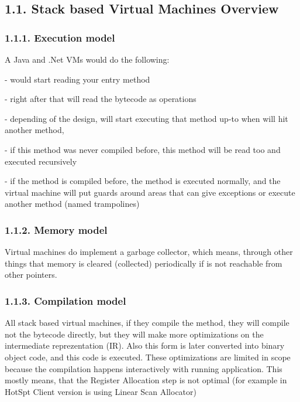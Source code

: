 \documentclass[letterpaper]{article}
\begin{document}
\bigskip

\subsection[1.1. Stack based Virtual Machines Overview]{1.1. Stack based Virtual Machines Overview}
\subsubsection[1.1.1. Execution model]{1.1.1. Execution model}
A Java and .Net VMs would do the following:

{}- would start reading your entry method

{}- right after that will read the bytecode as operations

{}- depending of the design, will start executing that method up-to when will hit another method,

{}- if this method was never compiled before, this method will be read too and executed recursively

{}- if the method is compiled before, the method is executed normally, and the virtual machine will put guards around
areas that can give exceptions or execute another method (named trampolines)


\bigskip

\subsubsection{1.1.2. Memory model}
Virtual machines do implement a garbage collector, which means, through other things that memory is cleared (collected)
periodically if is not reachable from other pointers. 


\bigskip

\subsubsection[1.1.3. Compilation model]{1.1.3. Compilation model}
All stack based virtual machines, if they compile the method, they will compile not the bytecode directly, but they will
make more optimizations on the intermediate reprezentation (IR). Also this form is later converted into binary object
code, and this code is executed. These optimizations are limited in scope because the compilation happens interactively
with running application. This mostly means, that the Register Allocation step is not optimal (for example in HotSpt
Client version is using Linear Scan Allocator)
\end{document}

